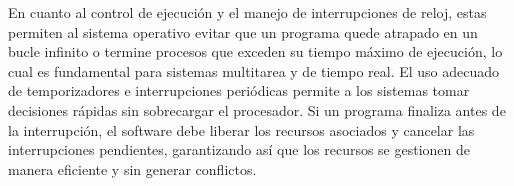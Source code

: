 \documentclass[]{article}
\begin{document}
En cuanto al control de ejecución y el manejo de interrupciones de reloj, estas permiten al sistema operativo evitar que un programa quede atrapado en un bucle infinito o termine procesos que exceden su tiempo máximo de ejecución, lo cual es fundamental para sistemas multitarea y de tiempo real. El uso adecuado de temporizadores e interrupciones periódicas permite a los sistemas tomar decisiones rápidas sin sobrecargar el procesador. Si un programa finaliza antes de la interrupción, el software debe liberar los recursos asociados y cancelar las interrupciones pendientes, garantizando así que los recursos se gestionen de manera eficiente y sin generar conflictos.
\end{document}
